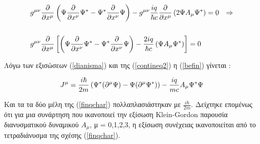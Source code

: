 \begin{align}
  \notag &g^{\mu\nu} \frac{\partial }{\partial x^\mu} \left(    \Psi\frac{\partial }{\partial x^\nu}\Psi^*  - \Psi^* \frac{\partial }{\partial x^\nu} \Psi \right)  - g^{\mu\nu} \frac{iq}{\hbar c} \frac{\partial }{\partial x^\mu}\left(  2\Psi A_\mu \Psi^* \right) =0 &\Rightarrow
  \notag\\
  \\& g^{\mu\nu} \frac{\partial }{\partial x^\mu} \left[   \left(  \Psi\frac{\partial }{\partial x^\nu}\Psi^*  - \Psi^* \frac{\partial }{\partial x^\nu} \Psi \right)  - \frac{2iq}{\hbar c} \left(  \Psi A_\mu \Psi^* \right)  \right]  = 0
  \label{befin}
\end{align}
\vspace{0.5cm}

Λόγω των εξισώσεων (\ref{dianisma}) και της (\ref{contineq2}) η (\ref{befin}) γίνεται : 
\vspace{0.5cm}
\begin{mdframed}
  \begin{equation}
    J^\mu =\frac{i \hbar}{2m} \left(  \Psi^* (\partial ^\mu \Psi)-\Psi(\partial ^\mu \Psi^*) \right)  - \frac{iq}{mc} A_\mu \Psi^* \Psi 
    \label{finqchar}
  \end{equation}
\end{mdframed}
\vspace{0.5cm}
Kαι τα τα δύο μέλη της (\ref{finqchar}) πολλαπλασιάστηκαν με $\frac{i \hbar}{2m}$. Δείχτηκε επομένως ότι για μια συνάρτηση που ικανοποιεί την εξίσωση \textlatin{Klein-Gordon} παρουσία διανυσματικού δυναμικού $A_\mu$, μ = 0,1,2,3, η εξίσωση συνέχειας ικανοποιείται από το τετραδιάνυσμα της σχέσης (\ref{finqchar}). 


